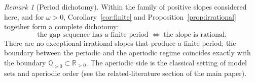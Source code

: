 \documentclass[11pt,reqno]{amsart}
\theoremstyle{plain}
\theoremstyle{definition}
\theoremstyle{remark}
\newtheorem{remark}[theorem]{Remark}
\begin{document}
\begin{remark}[Period dichotomy]\label{rem:dichotomy}
Within the family of positive slopes considered here, and for \(\omega > 0\),
Corollary~\ref{cor:finite} and Proposition~\ref{prop:irrational} together
form a complete dichotomy:
\[
    \text{the gap sequence has a finite period}
    \;\;\Longleftrightarrow\;\;
    \text{the slope is rational.}
\]
There are no exceptional irrational slopes that produce a finite period;
the boundary between the periodic and the aperiodic regime coincides exactly
with the boundary \(\mathbb{Q}_{>0} \subset \mathbb{R}_{>0}\).  The
aperiodic side is the classical setting of model sets and aperiodic order
(see the related-literature section of the main paper).
\end{remark}
\end{document}
